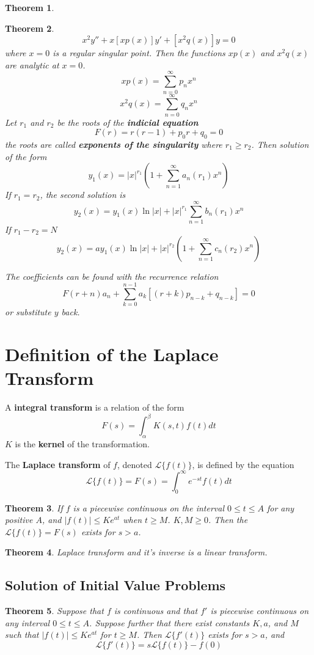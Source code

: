 \documentclass[letter]{article}
\newcommand{\laplace}[1]{\mathscr{L}\{#1\}}
\newtheorem{theorem}{Theorem}[section]
\newenvironment{definition}[1][Definition]{\begin{trivlist}
\item[\hskip \labelsep {\bfseries #1}]}{\end{trivlist}}
\begin{document}
\begin{definition}
\begin{theorem}
\end{theorem}
\begin{theorem}
\[ x^2y''+x[xp(x)]y'+[x^2q(x)]y=0 \]
where $x=0$ is a regular singular point. Then the functions $xp(x)$ and $x^2q(x)$ are analytic at $x=0$.
\[
xp(x) = \sum_{n=0}^\infty p_n x^n
\]
\[
x^2 q(x) = \sum_{n=0}^\infty q_n x^n
\]
Let $r_1$ and $r_2$ be the roots of the \textbf{indicial equation}
\[
F(r) = r(r-1) + p_0 r + q_0 = 0
\]
the roots are called \textbf{exponents of the singularity}
where $r_1 \geq r_2$. Then solution of the form
\[
y_1(x) = |x|^{r_1} \left( 1+\sum_{n=1}^\infty a_n(r_1)x^n \right)
\]
If $r_1 = r_2$, the second solution is
\[
y_2(x) = y_1(x) \ln|x| + |x|^{r_1} \sum_{n=1}^\infty b_n(r_1)x^n
\]
If $r_1-r_2 = N$
\[
y_2(x) = a y_1(x) \ln|x| + |x|^{r_2}  \left( 1+\sum_{n=1}^\infty c_n(r_2)x^n \right)
\]

The coefficients can be found with the recurrence relation\\
\[
F(r+n)a_n + \sum_{k=0}^{n-1} a_k[(r+k)p_{n-k} + q_{n-k}] = 0
\]
or substitute $y$ back.
\end{theorem}
\end{definition}
\section{Definition of the Laplace Transform}
\begin{definition}
A \textbf{integral transform} is a relation of the form 
\[
F(s) = \int_\alpha^\beta K(s,t) f(t) dt
\]
$K$ is the \textbf{kernel} of the transformation.
\end{definition}

\begin{definition}
The \textbf{Laplace transform} of $f$, denoted $\laplace{f(t)}$, is defined by the equation
\[
\laplace{f(t)} = F(s) = \int_0^\infty e^{-st} f(t) dt
\]
\end{definition}

\begin{theorem}
If $f$ is a piecewise continuous on the interval $0\leq t \leq A$ for any positive $A$, and $|f(t)| \leq Ke^{at}$ when $t\geq M$. $K,M\geq 0$. Then the $\laplace{f(t)}  = F(s)$ exists for $s > a$.
\end{theorem}

\begin{theorem}
Laplace transform and it's inverse is a linear transform.
\end{theorem}

\subsection{Solution of Initial Value Problems}
\begin{theorem}
Suppose that $f$ is continuous and that $f'$ is piecewise continuous on any interval $0\leq t \leq A$. Suppose further that there exist constants $K, a$, and $M$ such that $|f(t)| \leq Ke^{at}$ for $t\geq M$. Then $\laplace{f'(t)}$ exists for $s>a$, and
\[
\laplace{f'(t)} = s \laplace{f(t)} - f(0)
\]
\end{theorem}
\end{document}
